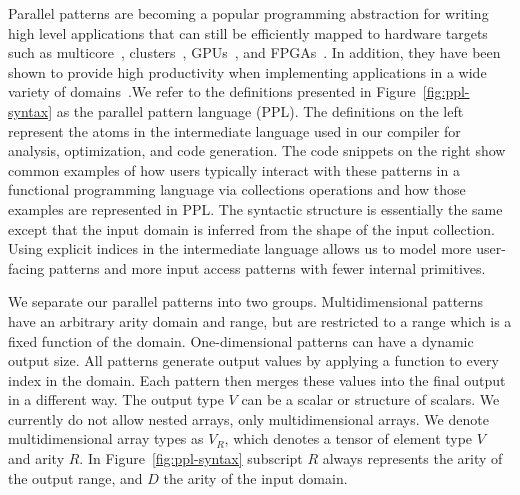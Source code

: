 % 
% 
% 



Parallel patterns are becoming a popular programming abstraction for writing high level applications that can still be efficiently mapped to hardware targets such as multicore~\cite{scala,haskell,delite-tecs14}, clusters~\cite{mapreduce,zaharia10spark,spartan}, GPUs~\cite{catanzaro11copperhead,micro14lee}, and FPGAs~\cite{auerbach10lime,george14fpl}. In addition, they have been shown to provide high productivity when implementing applications in a wide variety of domains~\cite{ecoop13sujeeth,pldi13halide}.We refer to the definitions presented in Figure~\ref{fig:ppl-syntax} as the parallel pattern language (PPL).
The definitions on the left represent the atoms in the intermediate language used in our compiler for analysis, optimization, and code generation. The code snippets on the right show common examples of how users typically interact with these patterns in a functional programming language via collections operations and how those examples are represented in PPL. The syntactic structure is essentially the same except that the input domain is inferred from the shape of the input collection. Using explicit indices in the intermediate language allows us to model more user-facing patterns and more input access patterns with fewer internal primitives.

We separate our parallel patterns into two groups. Multidimensional patterns have an arbitrary arity domain and range, but are restricted to a range which is a fixed function of the domain. One-dimensional patterns can have a dynamic output size. All patterns generate output values by applying a function to every index in the domain. Each pattern then merges these values into the final output in a different way. The output type $V$ can be a scalar or structure of scalars. We currently do not allow nested arrays, only multidimensional arrays. We denote multidimensional array types as $V_R$, which denotes a tensor of element type $V$ and arity $R$. In Figure~\ref{fig:ppl-syntax} subscript $R$ always represents the arity of the output range, and $D$ the arity of the input domain.

